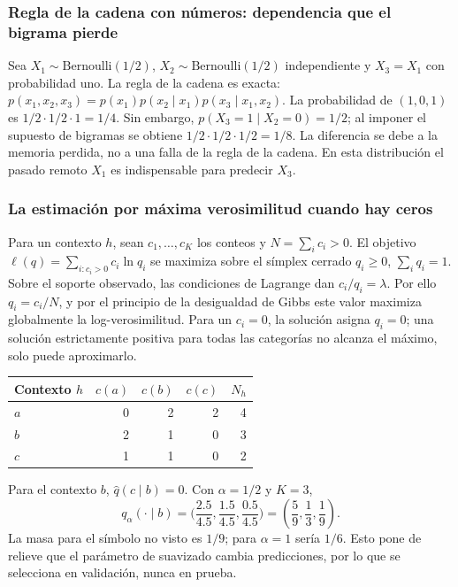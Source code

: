 \subsubsection*{Regla de la cadena con números: dependencia que el bigrama pierde}

Sea $X_1\sim\mathrm{Bernoulli}(1/2)$, $X_2\sim\mathrm{Bernoulli}(1/2)$ independiente
y $X_3=X_1$ con probabilidad uno. La regla de la cadena es exacta:
$p(x_1,x_2,x_3)=p(x_1)p(x_2\mid x_1)p(x_3\mid x_1,x_2)$.
La probabilidad de $(1,0,1)$ es $1/2\cdot1/2\cdot1=1/4$. Sin embargo,
$p(X_3=1\mid X_2=0)=1/2$; al imponer el supuesto de bigramas se obtiene
$1/2\cdot1/2\cdot1/2=1/8$. La diferencia se debe a la memoria perdida, no
a una falla de la regla de la cadena. En esta distribución el pasado remoto
$X_1$ es indispensable para predecir $X_3$.

\subsubsection*{La estimación por máxima verosimilitud cuando hay ceros}

Para un contexto $h$, sean $c_1,\ldots,c_K$ los conteos y $N=\sum_i c_i>0$.
El objetivo $\ell(q)=\sum_{i:c_i>0}c_i\ln q_i$ se maximiza sobre el símplex
cerrado $q_i\geq0$, $\sum_iq_i=1$. Sobre el soporte observado, las condiciones
de Lagrange dan $c_i/q_i=\lambda$. Por ello $q_i=c_i/N$, y por el principio
de la desigualdad de Gibbs este valor maximiza globalmente la log-verosimilitud.
Para un $c_i=0$, la solución asigna $q_i=0$; una solución estrictamente positiva
para todas las categorías no alcanza el máximo, solo puede aproximarlo.

\begin{center}
\begin{tabular}{lrrrr}\toprule
Contexto $h$ & $c(a)$ & $c(b)$ & $c(c)$ & $N_h$\\\midrule
$a$ & 0 & 2 & 2 & 4\\
$b$ & 2 & 1 & 0 & 3\\
$c$ & 1 & 1 & 0 & 2\\\bottomrule
\end{tabular}
\end{center}
Para el contexto $b$, $\hat q(c\mid b)=0$. Con $\alpha=1/2$ y $K=3$,
\[
q_\alpha(\cdot\mid b)=\biggl(\frac{2.5}{4.5},\frac{1.5}{4.5},
\frac{0.5}{4.5}\biggr)=\left(\frac59,\frac13,\frac19\right).
\]
La masa para el símbolo no visto es $1/9$; para $\alpha=1$ sería $1/6$.
Esto pone de relieve que el parámetro de suavizado cambia predicciones,
por lo que se selecciona en validación, nunca en prueba.

